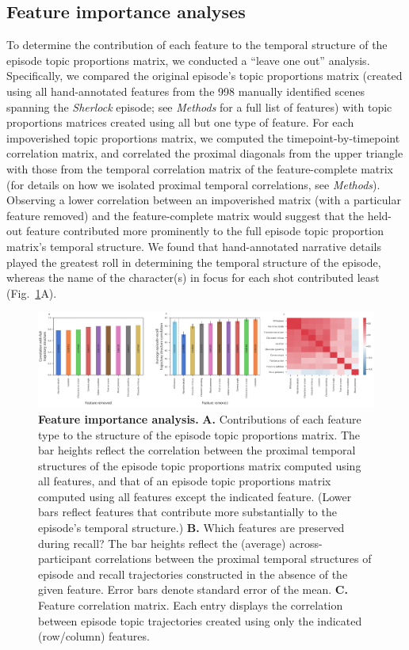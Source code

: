 \documentclass{article}
\begin{document}
\subsection*{Feature importance analyses}
To determine the contribution of each feature to the temporal structure of the episode topic proportions matrix, we conducted a ``leave one out'' analysis.  Specifically, we compared the original episode's topic proportions matrix (created using all hand-annotated features from the 998 manually identified scenes spanning the \textit{Sherlock} episode; see \textit{Methods} for a full list of features) with topic proportions matrices created using all but one type of feature.  For each impoverished topic proportions matrix, we computed the timepoint-by-timepoint correlation matrix, and correlated the proximal diagonals from the upper triangle with those from the temporal correlation matrix of the feature-complete matrix (for details on how we isolated proximal temporal correlations, see \textit{Methods}).  Observing a lower correlation between an impoverished matrix (with a particular feature removed) and the feature-complete matrix would suggest that the held-out feature contributed more prominently to the full episode topic proportion matrix's temporal structure.  We found that hand-annotated narrative details played the greatest roll in determining the temporal structure of the episode, whereas the name of the character(s) in focus for each shot contributed least (Fig.~\ref{fig:feature-importance}A).

\begin{figure}[]
\centering
\includegraphics[width=1\textwidth]{figs/feature_value}
\caption{\small \textbf{Feature importance analysis.} \textbf{A.} Contributions of each feature type to the structure of the episode topic proportions matrix. The bar heights reflect the correlation between the proximal temporal structures of the episode topic proportions matrix computed using all features, and that of an episode topic proportions matrix computed using all features except the indicated feature.  (Lower bars reflect features that contribute more substantially to the episode's temporal structure.) \textbf{B.} Which features are preserved during recall?  The bar heights reflect the (average) across-participant correlations between the proximal temporal structures of episode and recall trajectories constructed in the absence of the given feature.  Error bars denote standard error of the mean.  \textbf{C.} Feature correlation matrix.  Each entry displays the correlation between episode topic trajectories created using only the indicated (row/column) features.}
\label{fig:feature-importance}
\end{figure}
\end{document}
